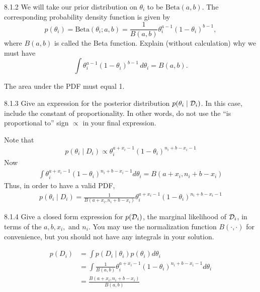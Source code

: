 \documentclass[12pt,letterpaper]{article}
\begin{document}
\begin{problem}{8.1.2}
    We will take our prior distribution on $\theta_{i}$ to be $\mbox{Beta}(a,b)$.
    The corresponding probability density function is given by
    \[
    p(\theta_{i})=\mbox{Beta}(\theta_{i};a,b)=\frac{1}{B(a,b)}\theta_{i}^{a-1}\left(1-\theta_{i}\right)^{b-1},
    \]
    where $B(a,b)$ is called the Beta function. Explain (without calculation)
    why we must have
    \[
    \int\theta_{i}^{a-1}\left(1-\theta_{i}\right)^{b-1}\,d\theta_{i}=B(a,b).
    \]
\end{problem}
\begin{solution}{}
    The area under the PDF must equal 1.
\end{solution}
\newpage

\begin{problem}{8.1.3}
    Give an expression for the posterior distribution $p(\theta_{i}\mid\mathcal{D}_{i})$.
    In this case, include the constant of proportionality. In other words,
    do not use the ``is proportional to'' sign $\propto$ in your final
    expression.
\end{problem}
\begin{solution}{}
    Note that
    \begin{align*}
        p(\theta_i\mid D_i) \propto \theta_i^{a+x_i-1}(1-\theta_i)^{n_i+b-x_i-1}
    \end{align*}
    Now
    \begin{align*}
        \int \theta_i^{a+x_i-1}(1-\theta_i)^{n_i+b-x_i-1} d\theta_i = B(a+x_i, n_i+b-x_i)
    \end{align*}
    Thus, in order to have a valid PDF,
    \begin{align*}
        p(\theta_i\mid D_i) = \frac{1}{B(a+x_i, n_i+b-x_i)}\theta_i^{a+x_i-1}(1-\theta_i)^{n_i+b-x_i-1}
    \end{align*}
\end{solution}
\newpage

\begin{problem}{8.1.4}
    Give a closed form expression for $p(\mathcal{D}_{i})$, the marginal likelihood
    of $\mathcal{D}_{i}$, in terms of the $a,b,x_{i},$ and $n_{i}$. You may
    use the normalization function $B(\cdot,\cdot)$ for convenience,
    but you should not have any integrals in your solution.
\end{problem}
\begin{solution}{}
    \begin{align*}
        p(D_i) &= \int p(D_i\mid\theta_i)p(\theta_i)d\theta_i\\
        &= \int \frac{1}{B(a,b)}\theta_i^{a+x_i-1}(1-\theta_i)^{n_i+b-x_i-1}d\theta_i\\
        &= \frac{B(a+x_i, n_i+b-x_i)}{B(a,b)}
    \end{align*}
\end{solution}
\newpage
\end{document}
